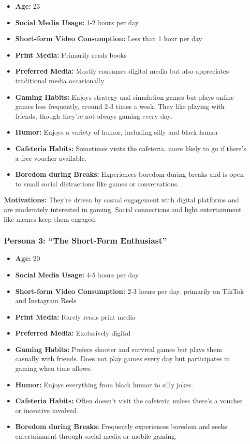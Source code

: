 \documentclass{article}
\begin{document}
\begin{itemize}
\item
  \textbf{Age:} 23
\item
  \textbf{Social Media Usage:} 1-2 hours per day
\item
  \textbf{Short-form Video Consumption:} Less than 1 hour per day
\item
  \textbf{Print Media:} Primarily reads books
\item
  \textbf{Preferred Media:} Mostly consumes digital media but also
  appreciates traditional media occasionally
\item
  \textbf{Gaming Habits:} Enjoys strategy and simulation games but plays
  online games less frequently, around 2-3 times a week. They like
  playing with friends, though they're not always gaming every day.
\item
  \textbf{Humor:} Enjoys a variety of humor, including silly and black
  humor
\item
  \textbf{Cafeteria Habits:} Sometimes visits the cafeteria, more likely
  to go if there's a free voucher available.
\item
  \textbf{Boredom during Breaks:} Experiences boredom during breaks and
  is open to small social distractions like games or conversations.
\end{itemize}

\textbf{Motivations:} They're driven by casual engagement with digital
platforms and are moderately interested in gaming. Social connections
and light entertainment like memes keep them engaged.

\subsubsection{Persona 3: ``The Short-Form Enthusiast''}\label{persona-3-the-short-form-enthusiast}

\begin{itemize}
\item
  \textbf{Age:} 20\\
\item
  \textbf{Social Media Usage:} 4-5 hours per day
\item
  \textbf{Short-form Video Consumption:} 2-3 hours per day, primarily on
  TikTok and Instagram Reels
\item
  \textbf{Print Media:} Rarely reads print media
\item
  \textbf{Preferred Media:} Exclusively digital
\item
  \textbf{Gaming Habits:} Prefers shooter and survival games but plays
  them casually with friends. Does not play games every day but
  participates in gaming when time allows.
\item
  \textbf{Humor:} Enjoys everything from black humor to silly jokes.
\item
  \textbf{Cafeteria Habits:} Often doesn't visit the cafeteria unless
  there's a voucher or incentive involved.
\item
  \textbf{Boredom during Breaks:} Frequently experiences boredom and
  seeks entertainment through social media or mobile gaming.
\end{itemize}
\end{document}
